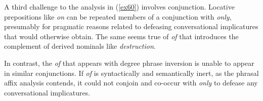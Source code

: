 \documentclass[output=paper,
modfonts
]{LSP/langsci}
\begin{document}
{{{A third challenge to the analysis in ({\ref{ex60}}) involves conjunction.  Locative prepositions like {\textit{on}} can be repeated members of a conjunction with {\textit{only}}, presumably for pragmatic reasons related to defeasing conversational implicatures that would otherwise obtain.  The same seems true of \textit{of} that introduces the complement of derived nominals like {\textit{destruction}}.
\begin{exe}
\ex\label{ex63}
\begin{xlist}
\end{xlist}
\end{exe}
In contrast, the {\textit{of}} that appears with degree phrase inversion is unable to appear in similar conjunctions.  If {\textit{of}} is syntactically and semantically inert, as the phrasal affix analysis contends, it could not conjoin and co-occur with {\textit{only}} to defease any conversational implicatures.
\begin{exe}
\ex \label{ex64}
\begin{xlist}
\end{xlist}
\end{exe}

}}}
\end{document}
